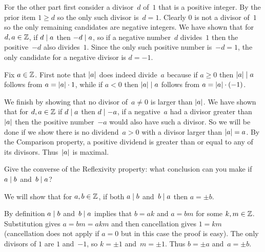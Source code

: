 \documentclass{ibl}
\begin{document}
\begin{ex}
\begin{ans}
\begin{exes}
  For the other part 
  first consider a divisor~$d$ of~$1$ that is a positive integer.
  By the prior item $1\geq d$ so the only such divisor is~$d=1$.
  Clearly $0$ is not a divisor of~$1$ so the only remaining candidates
  are negative integers.
  We have shown that for $d,a\in\mathbb{Z}$, if $d\mid a$ then $-d\mid a$,
  so if a negative number~$d$ divides~$1$ then the positive~$-d$ 
  also divides~$1$.
  Since the only such positive number is~$-d=1$, the only 
  candidate for a negative divisor is $d=-1$. 
\item Fix $a\in\mathbb{Z}$. 
  First note that $\lvert a\rvert$ does indeed divide~$a$ because
  if $a\geq 0$ then $\lvert a\rvert\mid a$ follows from 
  $a=\lvert a\rvert\cdot 1$,
  while if $a<0$ then $\lvert a\rvert\mid a$ follows from 
  $a=\lvert a\rvert\cdot(-1)$.

  We finish by showing that no divisor of~$a\neq 0$ is larger than $\lvert a\rvert$.
  We have shown that for $d,a\in\mathbb{Z}$ if $d\mid a$ then $d\mid -a$,
  if a negative~$a$ had a divisor greater than~$\lvert a\rvert$ then the
  positive number~$-a$ would also have such a divisor.
  So we will be done if
  we show there is no dividend~$a>0$ with a divisor larger than $\lvert a\rvert=a$.
  By the Comparison property, a positive dividend is greater than or 
  equal to any of its divisors. 
  Thus~$\lvert a\rvert$ is maximal. 
\end{exes}
\end{ans}
\end{ex}

\begin{ex}
Give the converse of the Reflexivity property: what conclusion can you make
if $a\mid b$ and~$b\mid a$?
\begin{ans}
We will show that for $a,b\in\mathbb{Z}$, if both $a\mid b$ and~$b\mid a$
then $a=\pm b$.

By definition $a\mid b$ and~$b\mid a$ implies that $b=ak$
and $a=bm$ for some $k,m\in\mathbb{Z}$.
Substitution gives $a=bm=akm$ and then cancellation gives $1=km$ (cancellation
does not apply if $a=0$ but in this case the proof is easy).
The only divisors of $1$ are $1$ and~$-1$, so $k=\pm 1$ and~$m=\pm 1$. 
Thus $b=\pm a$ and~$a=\pm b$.
\end{ans}
\end{ex}
\end{document}
